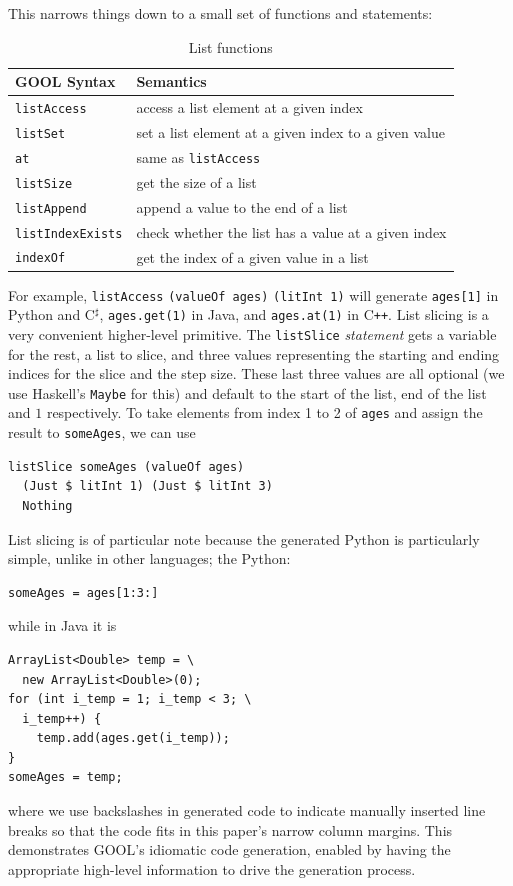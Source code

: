 \documentclass[sigplan,review,anonymous,prologue,dvipsnames]{acmart}
\newcommand{\Csharp}{C$^{\sharp}$}
\newcommand{\Cplusplus}{C\texttt{++}}
\begin{document}
This narrows things down to a small set of functions and statements:
\begin{table}[!h]
\caption{List functions}
\begin{tabular}{p{} p{}}
  \textbf{GOOL Syntax} & \textbf{Semantics} \\
  \midrule
  \verb|listAccess| & access a list element at a given index \\
  \verb|listSet| & set a list element at a given index to a given value \\
  \verb|at| & same as \verb|listAccess| \\
  \verb|listSize| & get the size of a list \\
  \verb|listAppend| & append a value to the end of a list \\
  \verb|listIndexExists| & check whether the list has a value at a given index 
  \\
  \verb|indexOf| & get the index of a given value in a list \\
\end{tabular}
\label{tab:listfuncs}
\end{table}
For example, \verb|listAccess| \verb|(valueOf ages)| \verb|(litInt 1)| will 
generate
\verb|ages[1]| in Python and \Csharp, \verb|ages.get(1)| in Java, and
\verb|ages.at(1)| in \Cplusplus.  List slicing is a very convenient
higher-level primitive.  The \verb|listSlice| \emph{statement} gets
a variable for the rest, a list to slice, and three
values representing the starting and ending indices for the slice and the step
size. These last three values are all optional (we use Haskell's \verb|Maybe|
for this) and default to the start of the list, end of the list and $1$
respectively.  To take elements from index 1 to 2 of \verb|ages| and
assign the result to \verb|someAges|, we can use
\begin{lstlisting}
listSlice someAges (valueOf ages)
  (Just $ litInt 1) (Just $ litInt 3)
  Nothing
\end{lstlisting}
List slicing is of particular note because the generated Python is particularly
simple, unlike in other languages; the Python:
\begin{lstlisting}
someAges = ages[1:3:]
\end{lstlisting}
while in Java it is
\begin{lstlisting}
ArrayList<Double> temp = \
  new ArrayList<Double>(0);
for (int i_temp = 1; i_temp < 3; \
  i_temp++) {
    temp.add(ages.get(i_temp));
}
someAges = temp;
\end{lstlisting}
where we use backslashes in generated code to indicate manually inserted
line breaks so that the code fits in this paper's narrow column margins.
This demonstrates GOOL's idiomatic code generation, enabled by having the
appropriate high-level information to drive the generation process.
\end{document}
